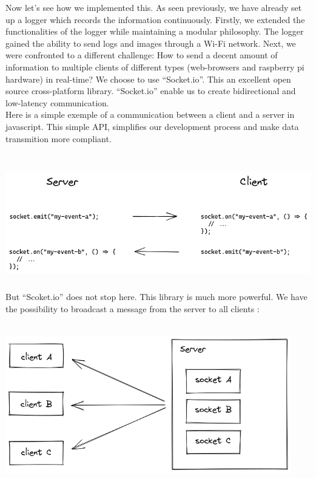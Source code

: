 \documentclass[12pt]{article}
\begin{document}
Now let's see how we implemented this. As seen previously, we have already set up a logger which records the information continuously. Firstly, we extended the functionalities of the logger while maintaining a modular philosophy. The logger gained the ability to send logs and images through a Wi-Fi network. Next, we were confronted to a different challenge: How to send a decent amount of information to multiple clients of different types (web-browsers and raspberry pi hardware) in real-time? We choose to use “Socket.io”. This an excellent open source cross-platform library. “Socket.io” enable us to create bidirectional and low-latency communication. \\ 

Here is a simple exemple of a communication between a client and a server in javascript. This simple API, simplifies our development process and make data transmition more compliant. \\ \\
\centerline{\includegraphics[height=5cm]{../../docs/server-client.png}}

But “Scoket.io” does not stop here. This library is much more powerful. We have the possibility to broadcast a message from the server to all clients : \\ \\
\centerline{\includegraphics[height=6cm]{../../docs/broadcast-0.png}}
\end{document}
